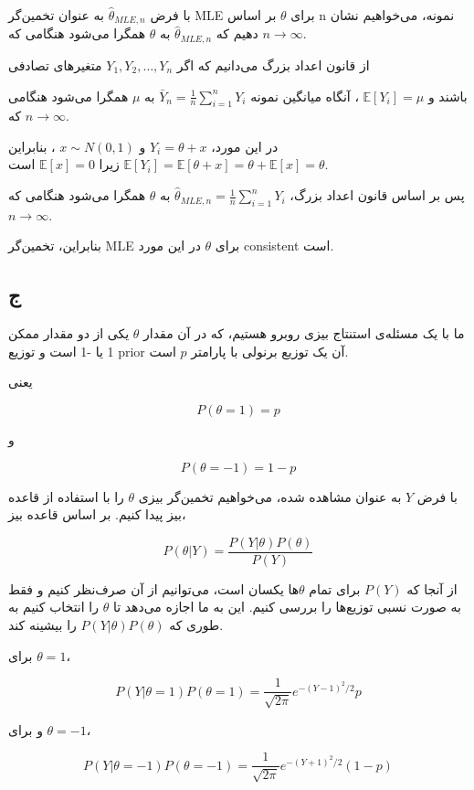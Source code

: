 با فرض \(\hat{\theta}_{MLE,n}\) به عنوان تخمین‌گر MLE برای \(\theta\) بر اساس n نمونه، می‌خواهیم نشان دهیم که \(\hat{\theta}_{MLE,n}\) به \(\theta\) همگرا می‌شود هنگامی که \(n \rightarrow \infty\). 

از قانون اعداد بزرگ می‌دانیم که اگر \(Y_1, Y_2, \ldots, Y_n\) متغیرهای تصادفی
 
 باشند و
\(\mathbb{E}[Y_i] = \mu\)
 ، آنگاه میانگین نمونه 
\(\bar{Y}_n = \frac{1}{n}\sum_{i=1}^{n} Y_i\) به \(\mu\)
همگرا می‌شود هنگامی که
\(n \rightarrow \infty\). 

در این مورد،
\(Y_i = \theta + x\) و \(x \sim N(0,1)\)
، بنابراین
\(\mathbb{E}[Y_i] = \mathbb{E}[\theta + x] = \theta + \mathbb{E}[x] = \theta\)
زیرا
\(\mathbb{E}[x] = 0\)
است.

پس بر اساس قانون اعداد بزرگ،
\(\hat{\theta}_{MLE,n} = \frac{1}{n}\sum_{i=1}^{n} Y_i\)
به
\(\theta\)
همگرا می‌شود هنگامی که \(n \rightarrow \infty\).

بنابراین، تخمین‌گر MLE برای \(\theta\) در این مورد consistent است.

\subsection*{ج}

ما با یک مسئله‌ی استنتاج بیزی روبرو هستیم، که در آن مقدار \(\theta\) یکی از دو مقدار ممکن 1 یا -1 است و توزیع prior آن یک توزیع برنولی با پارامتر \(p\) است. 

یعنی 

\[
P(\theta = 1) = p
\]

و 

\[
P(\theta = -1) = 1 - p
\]

با فرض \(Y\) به عنوان مشاهده شده، می‌خواهیم تخمین‌گر بیزی \(\theta\) را با استفاده از قاعده بیز پیدا کنیم. بر اساس قاعده بیز، 

\[
P(\theta | Y) = \frac{P(Y | \theta) P(\theta)}{P(Y)}
\]

از آنجا که \(P(Y)\) برای تمام \(\theta\)‌ها یکسان است، می‌توانیم از آن صرف‌نظر کنیم و فقط به صورت نسبی توزیع‌ها را بررسی کنیم. این به ما اجازه می‌دهد تا \(\theta\) را انتخاب کنیم به طوری که \(P(Y | \theta) P(\theta)\) را بیشینه کند.

برای \(\theta = 1\)، 

\[
P(Y | \theta = 1) P(\theta = 1) = \frac{1}{\sqrt{2 \pi}} e^{-(Y - 1)^2 / 2} p
\]

و برای \(\theta = -1\)، 

\[
P(Y | \theta = -1) P(\theta = -1) = \frac{1}{\sqrt{2 \pi}} e^{-(Y + 1)^2 / 2} (1 - p)
\]

